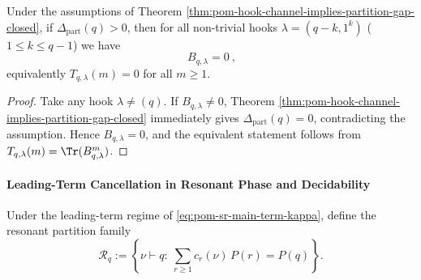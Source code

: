 \begin{theorem}[Strict Partition Gap \texorpdfstring{$\Rightarrow$}{=>} Hook-Type Channel Annihilation]\label{thm:pom-partition-gap-positive-kills-hooks}
Under the assumptions of Theorem \ref{thm:pom-hook-channel-implies-partition-gap-closed}, if \(\Delta_{\mathrm{part}}(q)>0\), then for all non-trivial hooks \(\lambda=(q-k,1^k)\) (\(1\le k\le q-1\)) we have
\[
\boxed{\ B_{q,\lambda}=0\ },
\]
equivalently \(T_{q,\lambda}(m)=0\) for all \(m\ge 1\).
\end{theorem}
\begin{proof}
Take any hook \(\lambda\neq(q)\). If \(B_{q,\lambda}\neq 0\), Theorem \ref{thm:pom-hook-channel-implies-partition-gap-closed} immediately gives \(\Delta_{\mathrm{part}}(q)=0\), contradicting the assumption.
Hence \(B_{q,\lambda}=0\), and the equivalent statement follows from \(T_{q,\lambda}(m)=\Tr(B_{q,\lambda}^m)\).
\end{proof}

\paragraph{Leading-Term Cancellation in Resonant Phase and Decidability}
Under the leading-term regime of \eqref{eq:pom-sr-main-term-kappa}, define the resonant partition family
\[
\mathcal{R}_q:=\left\{\nu\vdash q:\ \sum_{r\ge 1}c_r(\nu)\,P(r)=P(q)\right\}.
\]

